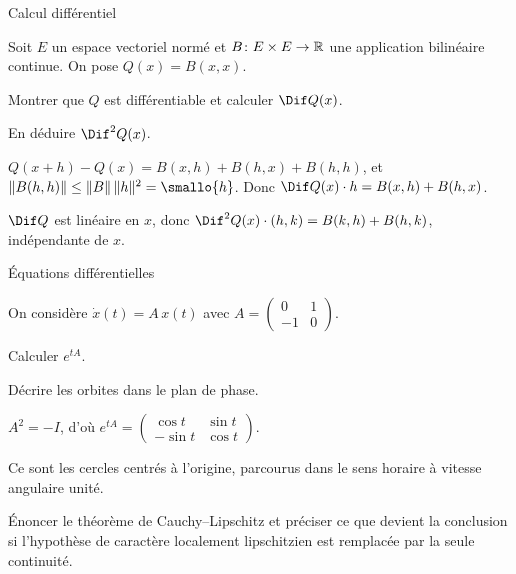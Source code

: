 \begin{docpart}
    Calcul différentiel
\end{docpart}

\begin{exercise}[points=4]
    Soit $E$ un espace vectoriel normé et $B \colon E \times E \to \mathbb{R}$ une
    application bilinéaire continue. On pose $Q(x) = B(x,x)$.
    \begin{question}
        Montrer que $Q$ est différentiable et calculer $\Dif Q(x)$.
    \end{question}
    \begin{question}
        En déduire $\Dif^2 Q(x)$.
    \end{question}
\solution
    \begin{question}
        $Q(x+h) - Q(x) = B(x,h) + B(h,x) + B(h,h)$, et
        $\norm{B(h,h)} \le \norm{B}\, \norm{h}^2 = \smallo{h}$. Donc
        $\Dif Q(x) \cdot h = B(x,h) + B(h,x)$.
    \end{question}
    \begin{question}
        $\Dif Q$ est linéaire en $x$, donc
        $\Dif^2 Q(x)\cdot(h,k) = B(k,h) + B(h,k)$, indépendante de $x$.
    \end{question}
\end{exercise}

\begin{docpart}
    Équations différentielles
\end{docpart}

\begin{exercise}[points=6]
    On considère $\dot{x}(t) = A\, x(t)$ avec
    $A = \begin{pmatrix} 0 & 1 \\ -1 & 0 \end{pmatrix}$.
    \begin{question}
        Calculer $e^{tA}$.
    \end{question}
    \begin{question}
        Décrire les orbites dans le plan de phase.
    \end{question}
\solution
    \begin{question}
        $A^2 = -I$, d'où
        $e^{tA} = \begin{pmatrix} \cos t & \sin t \\ -\sin t & \cos t\end{pmatrix}$.
    \end{question}
    \begin{question}
        Ce sont les cercles centrés à l'origine, parcourus dans le sens
        horaire à vitesse angulaire unité.
    \end{question}
\end{exercise}

\begin{exercise}[points=4, nosolution]
    Énoncer le théorème de Cauchy--Lipschitz et préciser ce que devient la
    conclusion si l'hypothèse de caractère localement lipschitzien est
    remplacée par la seule continuité.
\end{exercise}
